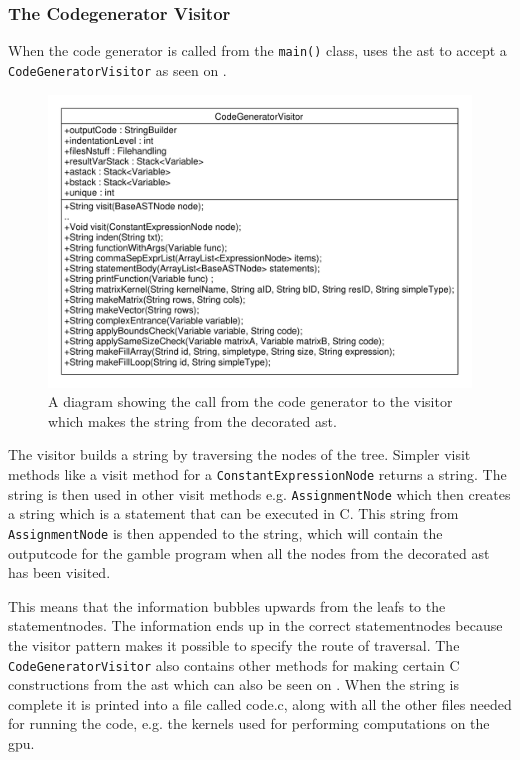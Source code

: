 \subsubsection*{The Codegenerator Visitor}
When the code generator is called from the \texttt{main()} class, uses the \acrshort{ast} to accept a \texttt{CodeGeneratorVisitor} as seen on .

\begin{figure}[!ht]
\centering
 \includegraphics[width=1\textwidth]{figures/ClassDiagrams/CodeGeneratorCall.pdf} %
\caption{A diagram showing the call from the code generator to the visitor which makes the string from the decorated \acrshort{ast}.}\label{fig:CodeGeneratorVisitor}
\vspace{-15pt}
\end{figure} 

The visitor builds a string by traversing the nodes of the tree.
Simpler visit methods like a visit method for a \texttt{ConstantExpressionNode} returns a string.
The string is then used in other visit methods e.g. \texttt{AssignmentNode} which then creates a string which is a statement that can be executed in C.
This string from \texttt{AssignmentNode} is then appended to the string, which will contain the outputcode for the \gls{gamble} program when all the nodes from the decorated \acrshort{ast} has been visited.

This means that the information bubbles upwards from the leafs to the statementnodes.
The information ends up in the correct statementnodes  because the visitor pattern makes it possible to specify the route of traversal.
The \texttt{CodeGeneratorVisitor} also contains other methods for making certain C constructions from the \acrshort{ast} which can also be seen on . 
When the string is complete it is printed into a file called code.c, along with all the other files needed for running the code, e.g. the kernels used for performing computations on the \acrshort{gpu}.

